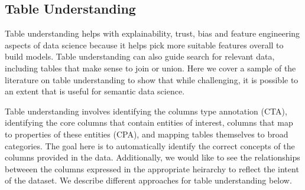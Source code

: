 \documentclass[sigconf, nonacm]{acmart}
\begin{document}
\subsection{Table Understanding}
\label{tabular_data_section}
Table understanding helps with explainability, trust, bias and feature engineering aspects of data science because it helps pick more suitable features overall to build models. 
 Table understanding can also guide search for relevant data, including tables that make sense to join or union. Here we cover a sample of the literature on table understanding to show that while challenging, it is possible to an extent that is useful for semantic data science.

Table understanding involves identifying the columns type annotation (CTA), identifying the core columns that contain entities of interest, columns that map to properties of these entities (CPA), and mapping tables themselves to broad categories. The goal here is to automatically identify the correct concepts of the columns provided in the data. Additionally, we would like to see the relationships betweeen the columns expressed in the appropriate heirarchy to reflect the intent of the dataset. 
We describe different approaches for table understanding below.
\end{document}
